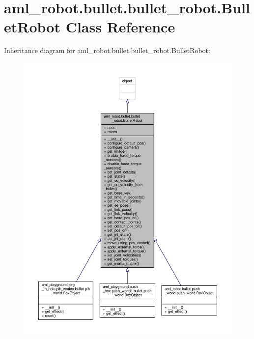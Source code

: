 \hypertarget{classaml__robot_1_1bullet_1_1bullet__robot_1_1_bullet_robot}{\section{aml\-\_\-robot.\-bullet.\-bullet\-\_\-robot.\-Bullet\-Robot Class Reference}
\label{classaml__robot_1_1bullet_1_1bullet__robot_1_1_bullet_robot}
}


Inheritance diagram for aml\-\_\-robot.\-bullet.\-bullet\-\_\-robot.\-Bullet\-Robot\-:
\nopagebreak
\begin{figure}[H]
\begin{center}
\leavevmode
\includegraphics[width=350pt]{classaml__robot_1_1bullet_1_1bullet__robot_1_1_bullet_robot__inherit__graph}
\end{center}
\end{figure}


